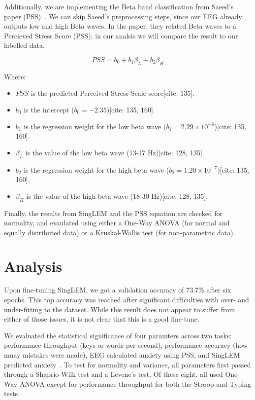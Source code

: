 \documentclass[journal]{IEEEtran}
\begin{document}
Additionally, we are implementing the Beta band classification from Saeed's paper (PSS)~\cite{muhammadumarsaeedQuantificationHumanStress2017}. We can skip Saeed's preprocessing steps, since our EEG already outputs low and high Beta waves. In the paper, they related Beta waves to a Percieved Stress Score (PSS); in our analsis we will compare the result to our labelled data.

\begin{equation}
    \label{eq:pss_prediction}
    PSS = b_0 + b_1\beta_L + b_2\beta_H
\end{equation}

Where:
\begin{itemize}
    \item $PSS$ is the predicted Perceived Stress Scale score[cite: 135].
    \item $b_0$ is the intercept ($b_0 = -2.35$)[cite: 135, 160].
    \item $b_1$ is the regression weight for the low beta wave ($b_1 = 2.29 \times 10^{-6}$)[cite: 135, 160].
    \item $\beta_L$ is the value of the low beta wave (13-17 Hz)[cite: 128, 135].
    \item $b_2$ is the regression weight for the high beta wave ($b_2 = 1.20 \times 10^{-7}$)[cite: 135, 160].
    \item $\beta_H$ is the value of the high beta wave (18-30 Hz)[cite: 128, 135].
\end{itemize}

Finally, the results from SingLEM and the PSS equation are checked for normality, and evaulated using either a One-Way ANOVA (for normal and equally distributed data) or a Kruskal-Wallis test (for non-parametric data).

\section{Analysis}
Upon fine-tuning SingLEM, we got a validation accuracy of 73.7\% after six epochs\cite{jtof-dev-EE-499-2026}. This top accuracy was reached after significant difficulties with over- and under-fitting to the dataset. While this result does not appear to suffer from either of those issues, it is not clear that this is a good fine-tune.


We evaluated the statistical significance of four paramters across two tasks: performance throughput (keys or words per second), performance accuracy (how mnay mistakes were made), EEG calculated anxiety using PSS, and SingLEM predicted anxiety~\cite{jtof-dev-EE-499-2026}. To test for normality and variance, all parameters first passed through a Shaprio-Wilk test and a Levene's test. Of these eight, all used One-Way ANOVA except for performance throughput for both the Stroop and Typing tests.
\end{document}
